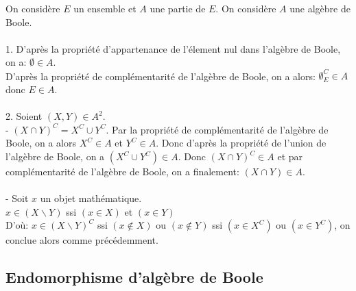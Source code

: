 \documentclass{article}
\begin{document}
			On considère $E$ un ensemble et $A$ une partie de $E$. On considère $A$ une algèbre de Boole.\\\\
			1. D'après la propriété d'appartenance de l'élement nul dans l'algèbre de Boole, on a: $\emptyset \in A$.\\
			D'après la propriété de complémentarité de l'algèbre de Boole, on a alors: $\emptyset_{E}^{C} \in A$ donc $E \in A$.\\\\
			2. Soient $(X,Y) \in A^2$.\\
			- $(X \cap Y)^C=X^C \cup Y^C$. Par la propriété de complémentarité de l'algèbre de Boole, on a alors $X^C \in A$ et $Y^C \in A$. Donc d'après la propriété de l'union de l'algèbre de Boole, on a $(X^C \cup Y^C) \in A$. Donc $(X \cap Y)^C \in A$ et par complémentarité de l'algèbre de Boole, on a finalement: $(X \cap Y) \in A$.\\\\
			- Soit $x$ un objet mathématique.\\
			$x \in (X \backslash Y)$ ssi $(x \in X)$ et $(x \in Y)$\\
			D'où: $x \in (X \backslash Y)^C$ ssi $(x \notin X)$ ou $(x \notin Y)$ ssi $(x \in X^C)$ ou $(x \in Y^C)$, on conclue alors comme précédemment.
			
			
			
			
		\subsection{Endomorphisme d'algèbre de Boole}
			
\end{document}
